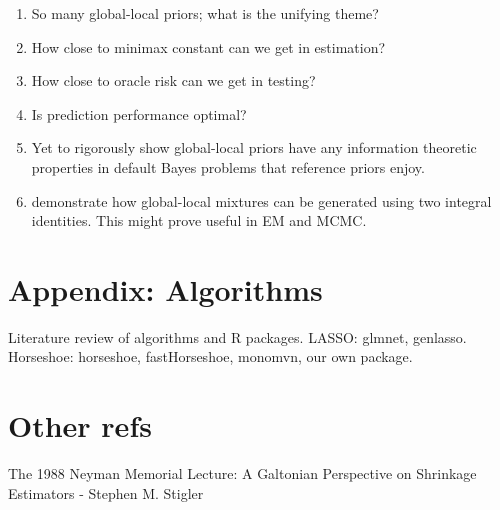 \documentclass[11pt]{article}
\numberwithin{equation}{section}
\begin{document}
\begin{enumerate}
\item So many global-local priors; what is the unifying theme?

\item How close to minimax constant can we get in estimation?

\item How close to oracle risk can we get in testing?

\item Is prediction performance optimal?

\item Yet to rigorously show global-local priors have any information theoretic properties in default Bayes problems that reference priors \citep{bernardo1979reference} enjoy.

\item \citet{bhadra2016global} demonstrate how global-local mixtures can be generated using two integral identities. This might prove useful in EM and MCMC.
\end{enumerate}

\section{Appendix: Algorithms}

Literature review of algorithms and R packages. 
LASSO: glmnet, genlasso. 
Horseshoe: horseshoe, fastHorseshoe, monomvn, our own package. 


\section*{Other refs}

The 1988 Neyman Memorial Lecture: A Galtonian Perspective on Shrinkage Estimators - Stephen M. Stigler



\end{document}
